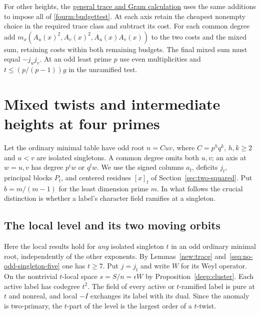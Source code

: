 \documentclass[11pt,a4paper]{article}
\numberwithin{equation}{section}
\theoremstyle{remark}
\begin{document}
For other heights, the \href{https://github.com/sebastienpalcoux/WGT-fusion-categories/blob/f7f9f9a02f3116e61eb9dca4eebfed77001494e8/code/four_primes/check_four.py}{general trace and Gram calculation} uses the same additions to impose all of
\eqref{fourm:budgettest}. At each axis retain the cheapest nonempty
choice in the required trace class and subtract its cost. For each common
degree add $m_x(A_u(x)^2,A_v(x)^2,A_u(x)A_v(x))$ to the two
costs and the mixed sum, retaining costs within both remaining budgets.
The final mixed sum must equal $-j_u j_v$. At an odd least prime $p$
use even multiplicities and $t\le(p/(p-1))g$ in the unramified test.

\section{Mixed twists and intermediate heights at four primes}\label{fam:M:sec:9}\label{sec:two-isolated}
Let the ordinary minimal table have odd root $n=Cuv$, where
$C=p^h q^k$, $h,k\ge2$ and $u<v$ are isolated singletons. A common
degree omits both $u,v$; an axis at $w=u,v$ has degree $p^iw$ or
$q^lw$. We use the signed columns $a_t$, deficits $j_t$, principal
blocks $P_t$, and centered residues $[x]_t$ of
Section~\ref{sec:two-squared}. Put $b=m/(m-1)$ for the least
dimension prime $m$. In what follows the crucial distinction is
whether a label's character field ramifies at a singleton.

\subsection{The local level and its two moving orbits}\label{fam:M:sec:9.1}
Here the local results hold for \emph{any} isolated singleton $t$ in an
odd ordinary minimal root, independently of the other exponents.
By Lemmas~\ref{new:trace} and~\ref{seq:no-odd-singleton-five} one has
$t\ge7$. Put $j=j_t$ and write $W$ for its Weyl operator. On the nontrivial $t$-local space $s=S/n=\epsilon W$
by Proposition~\ref{deep:cluster}. Each active label has codegree $t^2$.
The field of every active or $t$-ramified label is pure at $t$ and
nonreal, and local $-I$ exchanges its label with its dual. Since the
anomaly is two-primary, the $t$-part of the level is the largest
order of a $t$-twist.
\end{document}
